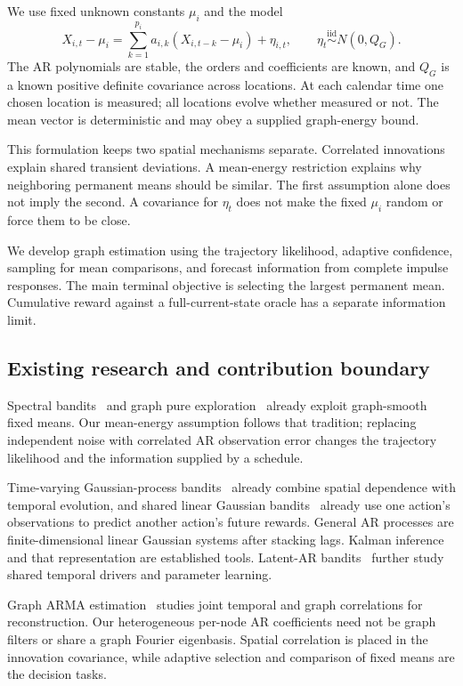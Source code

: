 \documentclass[11pt]{article}
\begin{document}
We use fixed unknown constants $\mu_i$ and the model
\begin{equation}
\boxed{X_{i,t}-\mu_i
=\sum_{k=1}^{p_i}a_{i,k}(X_{i,t-k}-\mu_i)+\eta_{i,t},
\qquad \eta_t\stackrel{\mathrm{iid}}{\sim}N(0,Q_G).}
\label{eq:model}
\end{equation}
The AR polynomials are stable, the orders and coefficients are known, and $Q_G$ is a known positive definite covariance across locations. At each calendar time one chosen location is measured; all locations evolve whether measured or not. The mean vector is deterministic and may obey a supplied graph-energy bound.

This formulation keeps two spatial mechanisms separate. Correlated innovations explain shared transient deviations. A mean-energy restriction explains why neighboring permanent means should be similar. The first assumption alone does not imply the second. A covariance for $\eta_t$ does not make the fixed $\mu_i$ random or force them to be close.

We develop graph estimation using the trajectory likelihood, adaptive confidence, sampling for mean comparisons, and forecast information from complete impulse responses. The main terminal objective is selecting the largest permanent mean. Cumulative reward against a full-current-state oracle has a separate information limit.

\subsection{Existing research and contribution boundary}
Spectral bandits~\cite{valko2014} and graph pure exploration~\cite{thaker2022} already exploit graph-smooth fixed means. Our mean-energy assumption follows that tradition; replacing independent noise with correlated AR observation error changes the trajectory likelihood and the information supplied by a schedule.

Time-varying Gaussian-process bandits~\cite{bogunovic2016} already combine spatial dependence with temporal evolution, and shared linear Gaussian bandits~\cite{gornet2024} already use one action's observations to predict another action's future rewards. General AR processes are finite-dimensional linear Gaussian systems after stacking lags. Kalman inference and that representation are established tools. Latent-AR bandits~\cite{trella2025} further study shared temporal drivers and parameter learning.

Graph ARMA estimation~\cite{guneyi2024} studies joint temporal and graph correlations for reconstruction. Our heterogeneous per-node AR coefficients need not be graph filters or share a graph Fourier eigenbasis. Spatial correlation is placed in the innovation covariance, while adaptive selection and comparison of fixed means are the decision tasks.
\end{document}
